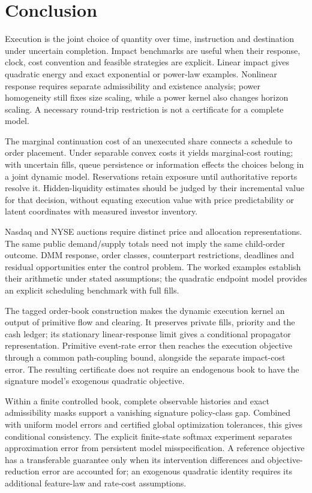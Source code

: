 \documentclass[11pt]{article}
\numberwithin{equation}{section}
\theoremstyle{definition}
\theoremstyle{remark}
\theoremstyle{definition}
\begin{document}
\section{Conclusion}

Execution is the joint choice of quantity over time, instruction and destination
under uncertain completion. Impact benchmarks are useful when their response,
clock, cost convention and feasible strategies are explicit. Linear impact gives
quadratic energy and exact exponential or power-law examples. Nonlinear response
requires separate admissibility and existence analysis; power homogeneity still
fixes size scaling, while a power kernel also changes horizon scaling. A
necessary round-trip restriction is not a certificate for a complete model.

The marginal continuation cost of an unexecuted share connects a schedule to
order placement. Under separable convex costs it yields marginal-cost routing;
with uncertain fills, queue persistence or information effects the choices belong
in a joint dynamic model. Reservations retain exposure until authoritative
reports resolve it. Hidden-liquidity estimates should be judged by their
incremental value for that decision, without equating execution value with price
predictability or latent coordinates with measured investor inventory.

Nasdaq and NYSE auctions require distinct price and allocation representations.
The same public demand/supply totals need not imply the same child-order outcome.
DMM response, order classes, counterpart restrictions, deadlines and residual
opportunities enter the control problem. The worked examples establish their
arithmetic under stated assumptions; the quadratic endpoint model provides an
explicit scheduling benchmark with full fills.

The tagged order-book construction makes the dynamic execution kernel an
output of primitive flow and clearing. It preserves private fills, priority
and the cash ledger; its stationary linear-response limit gives a conditional
propagator representation. Primitive event-rate error then reaches the
execution objective through a common path-coupling bound, alongside the
separate impact-cost error. The resulting certificate does not require an
endogenous book to have the signature model's exogenous quadratic objective.

Within a finite controlled book, complete observable histories and exact
admissibility masks support a vanishing signature policy-class gap. Combined
with uniform model errors and certified global optimization tolerances,
this gives conditional consistency. The explicit finite-state softmax
experiment separates approximation error from persistent model
misspecification. A reference objective has a transferable guarantee only
when its intervention differences and objective-reduction error are
accounted for; an exogenous quadratic identity requires its additional
feature-law and rate-cost assumptions.
\end{document}

